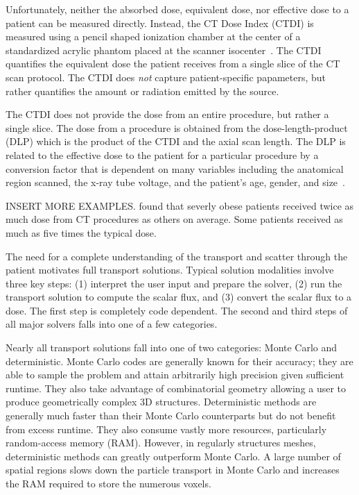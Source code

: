 Unfortunately, neither the absorbed dose, equivalent dose, nor effective dose to a patient can be measured directly. Instead, the CT Dose Index (CTDI) is measured using a pencil shaped ionization chamber at the center of  a standardized acrylic phantom placed at the scanner isocenter~\citep{ref:hudaw}. The CTDI quantifies the equivalent dose the patient receives from a single slice of the CT scan protocol. The CTDI does \textit{not} capture patient-specific papameters, but rather quantifies the amount or radiation emitted by the source.

The CTDI does not provide the dose from an entire procedure, but rather a single slice. The dose from a procedure is obtained from the dose-length-product (DLP) which is the product of the CTDI and the axial scan length. The DLP is related to the effective dose to the patient for a particular procedure by a conversion factor that is dependent on many variables including the anatomical region scanned, the x-ray tube voltage, and the patient's age, gender, and size~\citep{ref:hudaw}.

INSERT MORE EXAMPLES.
\citet{ref:lauk} found that severly obese patients received twice as much dose from CT procedures as others on average. Some patients received as much as five times the typical dose.

The need for a complete understanding of the transport and scatter through the patient motivates full transport solutions. Typical solution modalities involve three key steps: (1) interpret the user input and prepare the solver, (2) run the transport solution to compute the scalar flux, and (3) convert the scalar flux to a dose. The first step is completely code dependent. The second and third steps of all major solvers falls into one of a few categories.

Nearly all transport solutions fall into one of two categories: Monte Carlo and deterministic. Monte Carlo codes are generally known for their accuracy; they are able to sample the problem and attain arbitrarily high precision given sufficient runtime. They also take advantage of combinatorial geometry allowing a user to produce geometrically complex 3D structures. Deterministic methods are generally much faster than their Monte Carlo counterparts but do not benefit from excess runtime. They also consume vastly more resources, particularly random-access memory (RAM). However, in regularly structures meshes, deterministic methods can greatly outperform Monte Carlo. A large number of spatial regions slows down the particle transport in Monte Carlo and increases the RAM required to store the numerous voxels.

